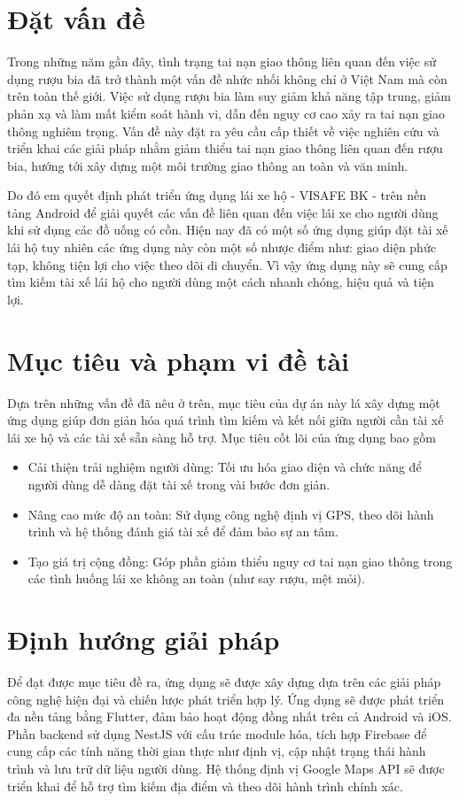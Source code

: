 \documentclass[../DoAn.tex]{subfiles}
\begin{document}
\section{Đặt vấn đề}
\label{section:1.1}
Trong những năm gần đây, tình trạng tai nạn giao thông liên quan đến việc sử dụng rượu bia đã trở thành một vấn đề nhức nhối không chỉ ở Việt Nam mà còn trên toàn thế giới. Việc sử dụng rượu bia làm suy giảm khả năng tập trung, giảm phản xạ và làm mất kiểm soát hành vi, dẫn đến nguy cơ cao xảy ra tai nạn giao thông nghiêm trọng.
Vấn đề này đặt ra yêu cầu cấp thiết về việc nghiên cứu và triển khai các giải pháp nhằm giảm thiểu tai nạn giao thông liên quan đến rượu bia, hướng tới xây dựng một môi trường giao thông an toàn và văn minh.

Do đó em quyết định phát triển ứng dụng lái xe hộ - VISAFE BK - trên nền tảng
Android để giải quyết các vấn đề liên quan đến việc lái xe cho người dùng
khi sử dụng các đồ uống có cồn.
Hiện nay đã có một số ứng dụng giúp đặt tài xế lái hộ tuy nhiên các ứng dụng này còn một số nhược điểm như: giao diện phức tạp, không tiện lợi cho việc theo dõi di chuyển.
Vì vậy ứng dụng này sẽ cung cấp tìm kiếm tài xế lái hộ cho người dùng một cách nhanh chóng, hiệu quả và tiện lợi.
\section{Mục tiêu và phạm vi đề tài}
\label{section:1.2}
Dựa trên những vấn đề đã nêu ở trên, mục tiêu của dự án này lá xây dựng một ứng dụng giúp đơn giản hóa quá trình tìm kiếm và kết nối giữa người cần tài xế lái xe hộ và các tài xế sẵn sàng hỗ trợ.
Mục tiêu cốt lõi của ứng dụng bao gồm
\begin{itemize}
  \item Cải thiện trải nghiệm người dùng: Tối ưu hóa giao diện và chức năng để người dùng dễ dàng đặt tài xế trong vài bước đơn giản.
  \item Nâng cao mức độ an toàn: Sử dụng công nghệ định vị GPS, theo dõi hành trình và hệ thống đánh giá tài xế để đảm bảo sự an tâm.
  \item Tạo giá trị cộng đồng: Góp phần giảm thiểu nguy cơ tai nạn giao thông trong các tình huống lái xe không an toàn (như say rượu, mệt mỏi).
\end{itemize}


\section{Định hướng giải pháp}
\label{section:1.3}
Để đạt được mục tiêu đề ra, ứng dụng sẽ được xây dựng dựa trên các giải pháp công nghệ hiện đại và chiến lược phát triển hợp lý. Ứng dụng sẽ được phát triển đa nền tảng bằng Flutter, đảm bảo hoạt động đồng nhất trên cả Android và iOS. Phần backend sử dụng NestJS với cấu trúc module hóa, tích hợp Firebase để cung cấp các tính năng thời gian thực như định vị, cập nhật trạng thái hành trình và lưu trữ dữ liệu người dùng. Hệ thống định vị Google Maps API sẽ được triển khai để hỗ trợ tìm kiếm địa điểm và theo dõi hành trình chính xác.
\end{document}
